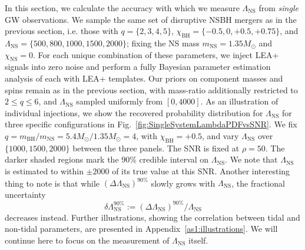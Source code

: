 \documentclass[aps,prd,amsmath,floats,floatfix, twocolumn,
superscriptaddress,nofootinbib,showpacs]{revtex4-1}
\newcommand{\lambdans}{\Lambda_\mathrm{NS}}
\newcommand{\chibh}{\chi_\mathrm{BH}}
\newcommand{\chins}{\chi_\mathrm{NS}}
\newcommand{\mbh}{m_\mathrm{BH}}
\newcommand{\mns}{m_\mathrm{NS}}
\begin{document}
In this section, we calculate the accuracy with which we measure $\lambdans$ from
{\it single} GW observations. We sample the same set of disruptive NSBH mergers
as in the previous section, i.e. those with $q=\{2,3,4,5\}$,
$\chibh=\{-0.5,0,+0.5,+0.75\}$, and $\lambdans=\{500, 800, 1000, 1500, 2000\}$;
fixing the NS mass $\mns=1.35 M_\odot$ and $\chins=0$. For each unique
combination of these parameters, we inject LEA+ signals into zero noise and
perform a fully Bayesian parameter estimation analysis of each with LEA+
templates. Our  priors on component masses and spins remain as in the
previous section, with mass-ratio additionally restricted to $2\leq q\leq 6$,
and $\lambdans$ sampled uniformly from $[0,4000]$.
% 
%
As an illustration of individual injections, we show the recovered probability
distribution for $\lambdans$ for three specific configurations in 
Fig.~\ref{fig:SingleSystemLambdaPDFvsSNR}. We fix
$q = \mbh /\mns = 5.4M_\odot/1.35M_\odot = 4$, with $\chibh=+0.5$, and
vary $\lambdans$ over $\{1000, 1500, 2000\}$ between the three panels.
The SNR is fixed at $\rho=50$. The darker shaded regions mark the $90\%$ credible
interval on $\lambdans$. We note that $\lambdans$ is estimated to within
$\pm 2000$ of its true value at this SNR. Another interesting thing to note 
is that while $(\Delta\lambdans)^{90\%}$ slowly grows with $\lambdans$, the
fractional uncertainty
\begin{equation}
\delta\lambdans^{90\%}:= (\Delta\lambdans)^{90\%}/\lambdans
\end{equation}
decreases instead.
%
Further illustrations, showing the correlation between tidal and non-tidal
parameters, are presented in Appendix~\ref{as1:illustrations}.
We will continue here to focus on the measurement of $\lambdans$ itself.
% 
\end{document}
